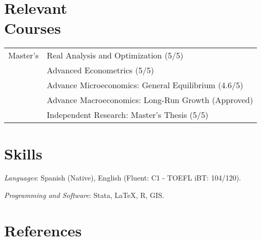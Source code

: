\documentclass[margin,line]{res}
\begin{document}
\begin{resume}
\vspace{-.2cm}

\section{\sc Relevant \\ Courses}

\begin{tabular}{p{1.5cm}p{10cm}}
Master's & Real Analysis and Optimization (5/5)                 \\
         & Advanced Econometrics  (5/5)                         \\
         & Advance Microeconomics: General Equilibrium (4.6/5)  \\
         & Advance Macroeconomics: Long-Run Growth (Approved)   \\
         & Independent Research: Master's Thesis (5/5)          \\
\end{tabular}

\section{\sc Skills}

\textit{Languages}: Spanish (Native), English (Fluent: C1 - TOEFL iBT: 104/120).

\vspace{-.2cm}

\textit{Programming and Software}: Stata, {\LaTeX}, \textsc{R}, \textsc{GIS}. 

\section{\sc References}


\end{resume}
\end{document}
